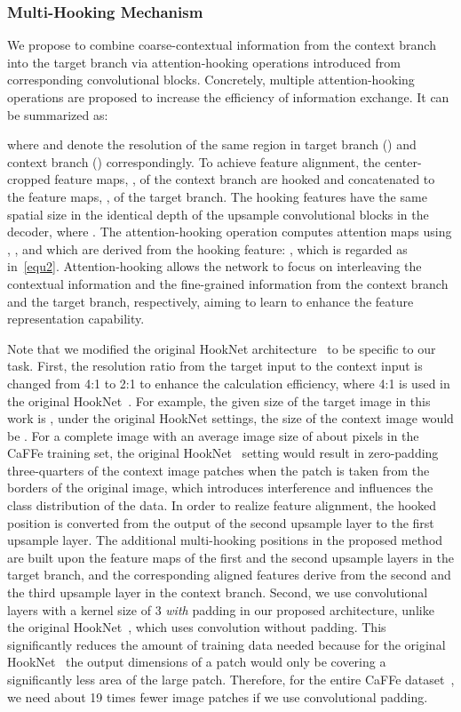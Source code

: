 \documentclass[lettersize,journal,siunitx]{IEEEtran}
\begin{document}
\subsubsection{Multi-Hooking Mechanism}
We propose to combine coarse-contextual information from the context branch into the target branch via attention-hooking operations introduced from corresponding convolutional blocks. Concretely, multiple attention-hooking operations are proposed to increase the efficiency of information exchange. It can be summarized as:

where  and  denote the resolution of the same region in target branch () and context branch () correspondingly. To achieve feature alignment, the center-cropped feature maps, , of the context branch are hooked and concatenated to the feature maps, , of the target branch. The hooking features have the same spatial size in the identical depth  of the upsample convolutional blocks in the decoder, where . The attention-hooking operation computes attention maps using , , and  which are derived from the hooking feature: , which is regarded as  in~\cref{equ2}. Attention-hooking allows the network to focus on interleaving the contextual information and the fine-grained information from the context branch and the target branch, respectively, aiming to learn to enhance the feature representation capability.

Note that we modified the original HookNet architecture~\cite{van2021hooknet} to be specific to our task. First, the resolution ratio from the target input to the context input is changed from 4:1 to 2:1 to enhance the calculation efficiency, where 4:1 is used in the original HookNet~\cite{van2021hooknet}. For example, the given size of the target image in this work is , under the original HookNet settings, the size of the context image would be . For a complete image with an average image size of about  pixels in the CaFFe training set, the original HookNet~\cite{van2021hooknet} setting would result in zero-padding three-quarters of the context image patches when the patch is taken from the borders of the original image, which introduces interference and influences the class distribution of the data. In order to realize feature alignment, the hooked position is converted from the output of the second upsample layer to the first upsample layer. The additional multi-hooking positions in the proposed method are built upon the feature maps of the first and the second upsample layers in the target branch, and the corresponding aligned features derive from the second and the third upsample layer in the context branch. Second, we use convolutional layers with a kernel size of 3 \emph{with} padding in our proposed architecture, unlike the original HookNet~\cite{van2021hooknet}, which uses convolution without padding. This significantly reduces the amount of training data needed because for the original HookNet~\cite{van2021hooknet} the output dimensions of a patch would only be  covering a significantly less area of the  large patch. Therefore, for the entire CaFFe dataset~\cite{essd-14-4287-2022}, we need about 19 times fewer image patches if we use convolutional padding.
\end{document}
